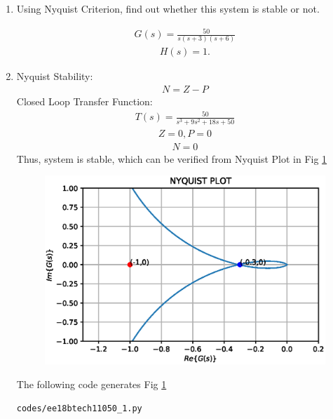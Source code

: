 \begin{enumerate}[label=\thesection.\arabic*.,ref=\thesection.\theenumi]
\item Using Nyquist Criterion, find out whether this system is stable or not.

\begin{align}
    G(s) = \frac{50}{s(s+3)(s+6)}
    \label{eq:ee18btech11050_1}
\end{align}
\begin{align}
    H(s) = 1.
    \label{eq:ee18btech11050_2}
\end{align}

\item \solution 
Nyquist Stability:
\begin{align}
    N = Z -P
\end{align}
Closed Loop Transfer Function:
\begin{align}
    T(s) = \frac{50}{s^3+9s^2+18s+50}
\end{align}
\begin{align}
    Z = 0, P = 0
\end{align}
\begin{align}
    N = 0
\end{align}
Thus, system is stable, which can be verified from Nyquist Plot in Fig \ref{fig:ee18btech11050_fig1}

\begin{figure}[!ht]
\centering
\includegraphics[width=\columnwidth]{./figs/ee18btech11050_1.eps}
\caption{}
\label{fig:ee18btech11050_fig1}
\end{figure}

The following code generates Fig \ref{fig:ee18btech11050_fig1}
\begin{lstlisting}
codes/ee18btech11050_1.py
\end{lstlisting}

\end{enumerate}
